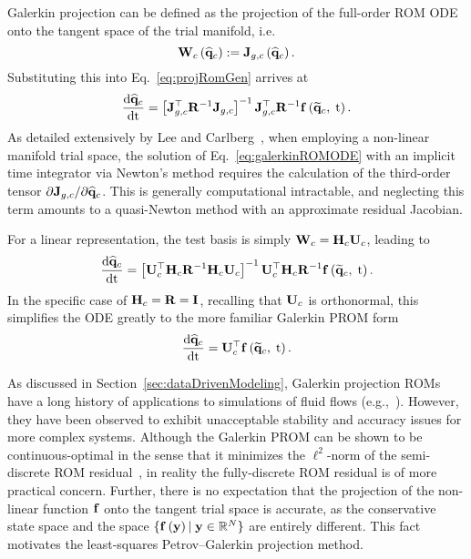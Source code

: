 Galerkin projection can be defined as the projection of the full-order ROM ODE onto the tangent space of the trial manifold, i.e.
%
\begin{equation}
    \testBasisCons\left(\consVecCoef\right) \defEq \jacobDecodeConsFunc{\consVecCoef}.
\end{equation}
%
Substituting this into Eq.~\ref{eq:projRomGen} arrives at
%
\begin{equation}\label{eq:galerkinROMODE}
    \ode{\consVecCoef}{\timeVar} = \left[\jacobDecodeCons^\top \resScaleInv \jacobDecodeCons\right]^{-1} \jacobDecodeCons^\top \resScaleInv \rhsFunc{\consVecRom, \; \timeVar}.
\end{equation}
%
As detailed extensively by Lee and Carlberg~\cite{Lee2020}, when employing a non-linear manifold trial space, the solution of Eq.~\ref{eq:galerkinROMODE} with an implicit time integrator via Newton's method requires the calculation of the third-order tensor $\partial \mathbf{J}_{g,c} / \partial \mathbf{\widehat{q}}_{c}$. This is generally computational intractable, and neglecting this term amounts to a quasi-Newton method with an approximate residual Jacobian.

For a linear representation, the test basis is simply $\testBasisCons = \consScale \consTrial$, leading to
%
\begin{equation}\label{eq:galerkinROMODELinear}
	\ode{\consVecCoef}{\timeVar} = \left[\consTrial^\top \consScale \resScaleInv \consScale \consTrial\right]^{-1} \consTrial^\top \consScale \resScaleInv \rhsFunc{\consVecRom, \; \timeVar}.
\end{equation}
%
In the specific case of $\consScale = \resScale = \identMat$, recalling that $\consTrial$ is orthonormal, this simplifies the ODE greatly to the more familiar Galerkin PROM form
%
\begin{equation}\label{eq:galerkinROMODELinearSimple}
    \ode{\consVecCoef}{\timeVar} = \consTrial^\top \rhsFunc{\consVecRom, \; \timeVar}.
\end{equation}

As discussed in Section~\ref{sec:dataDrivenModeling}, Galerkin projection ROMs have a long history of applications to simulations of fluid flows (e.g.,~\cite{Aubry1988,Cazemier1998,BuiThanh2007}). However, they have been observed to exhibit unacceptable stability and accuracy issues for more complex systems. Although the Galerkin PROM can be shown to be continuous-optimal in the sense that it minimizes the $\ell^2$-norm of the semi-discrete ROM residual~\cite{Carlberg2017}, in reality the fully-discrete ROM residual is of more practical concern. Further, there is no expectation that the projection of the non-linear function $\mathbf{f}$ onto the tangent trial space is accurate, as the conservative state space and the space $\{\mathbf{f} \left(\mathbf{y}\right) \vert \; \mathbf{y} \in \mathbb{R}^{N} \}$ are entirely different. This fact motivates the least-squares Petrov--Galerkin projection method.

